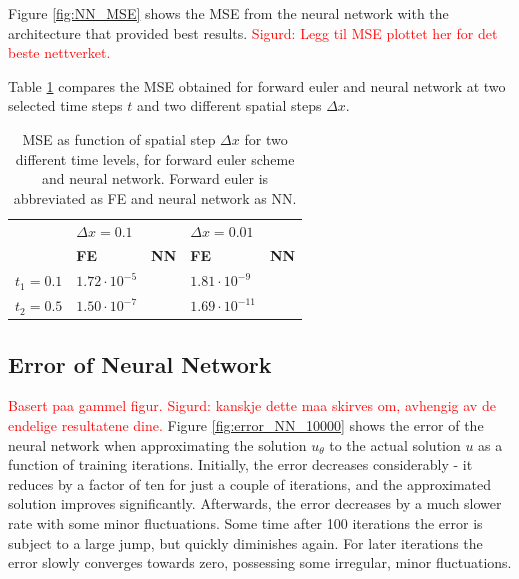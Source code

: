 \documentclass[12pt]{extarticle}
\begin{document}
Figure \ref{fig:NN_MSE} shows the MSE from the neural network with the architecture that provided best results. \textcolor{red}{Sigurd: Legg til MSE plottet her for det beste nettverket.}

Table \ref{tab:MSE_compare} compares the MSE obtained for forward euler and neural network at two selected time steps $t$ and two different spatial steps $\Delta x$. 


\begin{table}[h]
	\centering
	\begin{tabular}{l|ll|ll|}
		\cline{2-5}
		& \multicolumn{2}{l|}{\textbf{$\Delta x=0.1$}}           & \multicolumn{2}{l|}{\textbf{$\Delta x=0.01$}}           \\ \cline{2-5} 
		& \multicolumn{1}{l|}{\textbf{FE}}         & \textbf{NN} & \multicolumn{1}{l|}{\textbf{FE}}          & \textbf{NN} \\ \hline
		\multicolumn{1}{|l|}{\textbf{$t_1=0.1$}} & \multicolumn{1}{l|}{$1.72\cdot 10^{-5}$} &             & \multicolumn{1}{l|}{$1.81\cdot 10^{-9}$}  &             \\ \hline
		\multicolumn{1}{|l|}{\textbf{$t_2=0.5$}} & \multicolumn{1}{l|}{$1.50\cdot 10^{-7}$} &             & \multicolumn{1}{l|}{$1.69\cdot 10^{-11}$} &             \\ \hline
	\end{tabular}
\caption{MSE as function of spatial step $\Delta x$ for two different time levels, for forward euler scheme and neural network. Forward euler is abbreviated as FE and neural network as NN.}
\label{tab:MSE_compare}
\end{table}


\subsection{Error of Neural Network}

\textcolor{red}{Basert paa gammel figur. Sigurd: kanskje dette maa skirves om, avhengig av de endelige resultatene dine.}
Figure \ref{fig:error_NN_10000} shows the error of the neural network when approximating the solution $u_{\theta}$ to the actual solution $u$ as a function of training iterations. Initially, the error decreases considerably - it reduces by a factor of ten for just a couple of iterations, and the approximated solution improves significantly. Afterwards, the error decreases by a much slower rate with some minor fluctuations. Some time after 100 iterations the error is subject to a large jump, but quickly diminishes again. For later iterations the error slowly converges towards zero, possessing some irregular, minor fluctuations. 
\end{document}
